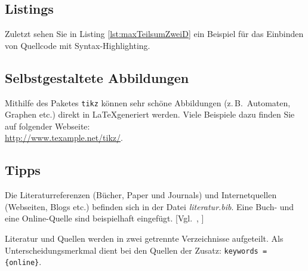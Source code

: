 \documentclass[12pt,a4paper,bibliography=totocnumbered,listof=totocnumbered]{article}
\begin{document}
\subsection{Listings}
Zuletzt sehen Sie in Listing \ref{lst:maxTeilsumZweiD} ein Beispiel für das Einbinden von Quellcode mit Syntax-Highlighting.

\vspace{1em}


\subsection{Selbstgestaltete Abbildungen}
Mithilfe des Paketes \texttt{tikz} können sehr schöne Abbildungen (z.\,B.\ Automaten, Graphen etc.) direkt in \LaTeX generiert werden. Viele Beispiele dazu finden Sie auf folgender Webseite:\\[1em]
\hspace*{3cm}\url{http://www.texample.net/tikz/}.

\subsection{Tipps}
Die Literaturreferenzen (Bücher, Paper und Journals) und Internetquellen (Webseiten, Blogs etc.) befinden sich in der Datei \textit{literatur.bib}. Eine Buch- und eine Online-Quelle sind beispielhaft eingefügt. [Vgl.\ \cite{buch}, \cite{mathcomm}]

Literatur und Quellen werden in zwei getrennte Verzeichnisse aufgeteilt. Als Unterscheidungsmerkmal dient bei den Quellen der Zusatz: \texttt{keywords = \{online\}}.

\pagebreak


  
\end{document}
